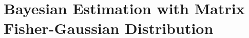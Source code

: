 
\chapter{Bayesian Estimation with Matrix Fisher-Gaussian Distribution} \label{chap:estimation}









